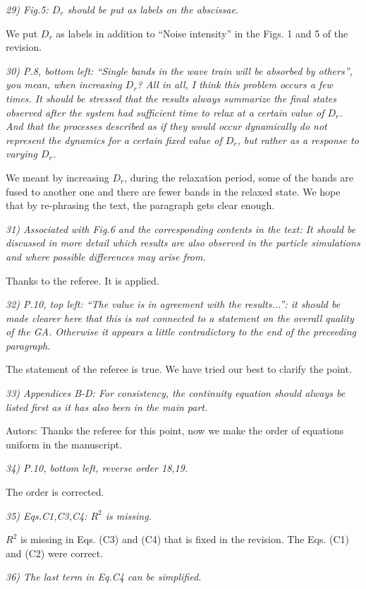 \documentclass[a4paper,11pt]{letter}
\newcommand{\rf}[1]{\textit{\textcolor{hlcolor}{#1}}}
\begin{document}
\rf{29) Fig.5: $D_r$ should be put as labels on the abscissae.}

We put $D_r$ as labels in addition to ``Noise intensity'' in the Figs. 1 and 5 of the revision.

\rf{30) P.8, bottom left: ``Single bands in the wave train will be absorbed by others'', you mean, when increasing $D_r$? All in all, I think this problem occurs a few times. It should be stressed that the results always summarize the final states observed after the system had sufficient time to relax at a certain value of $D_r$. And that the processes described as if they would occur dynamically do not represent the dynamics for a certain fixed value of $D_r$, but rather as a response to varying $D_r$.}

We meant by increasing $D_r$, during the relaxation period, some of the bands are fused to another one and there are fewer bands in the relaxed state. We hope that by re-phrasing the text, the paragraph gets clear enough.

\rf{31) Associated with Fig.6 and the corresponding contents in the text: It should be discussed in more detail which results are also observed in the particle simulations and where possible differences may arise from.}

Thanks to the referee. It is applied.

\rf{32) P.10, top left: ``The value is in agreement with the results...'': it should be made clearer here that this is not connected to a statement on the overall quality of the GA. Otherwise it appears a little contradictory to the end of the preceeding paragraph.}

The statement of the referee is true.  We have tried our best to clarify the point.

\rf{33) Appendices B-D: For consistency, the continuity equation should
always be listed first as it has also been in the main part.}

Autors: Thanks the referee for this point, now we make the order of equations uniform in the manuscript.

\rf{34) P.10, bottom left, reverse order 18,19.}

The order is corrected.

\rf{35) Eqs.C1,C3,C4: $R^2$ is missing.}

$R^2$ is missing in Eqs. (C3) and (C4) that is fixed in the revision. The Eqs. (C1) and (C2) were correct. 

\rf{36) The last term in Eq.C4 can be simplified.}
\end{document}
